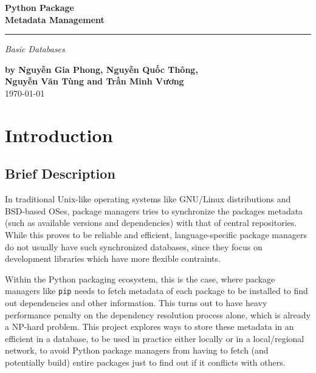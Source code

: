 \documentclass[a4paper,12pt]{article}
\begin{document}
\setcounter{page}{0}
\thispagestyle{empty}
\begin{flushright}
  \setlength{\baselineskip}{1.4\baselineskip}
\textbf{\Huge Python Package\\Metadata Management}
  \noindent\rule{\textwidth}{5pt}
  \emph{\Large Basic Databases}

  \textbf{by Nguyễn Gia Phong, Nguyễn Quốc Thông,\\
          Nguyễn Văn Tùng and Trần Minh Vương\\}
  \today
\end{flushright}
\pagebreak

\tableofcontents
\pagebreak

\section{Introduction}
\subsection{Brief Description}
In traditional Unix-like operating systems like GNU/Linux distributions
and BSD-based OSes, package managers tries to synchronize the packages metadata
(such as available versions and dependencies) with that of central repositories.
While this proves to be reliable and efficient, language-specific
package managers do not usually have such synchronized databases,
since they focus on development libraries which have more flexible contraints.

Within the Python packaging ecosystem, this is the case, where package managers
like \verb|pip| needs to fetch metadata of each package to be installed
to find out dependencies and other information.  This turns out to have heavy
performance penalty on the dependency resolution process alone, which is
already a NP-hard problem.  This project explores ways to store these metadata
in an efficient in a database, to be used in practice either locally or in a
local/regional network, to avoid Python package managers from having to
fetch (and potentially build) entire packages just to find out if it conflicts
with others.

\end{document}
